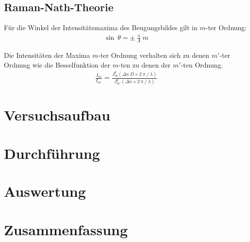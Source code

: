 \documentclass[12pt]{article}
\begin{document}
\subsection{Raman-Nath-Theorie}
Für die Winkel der Intensitätsmaxima des Beugungsbildes gilt in $m$-ter Ordnung:
\begin{align}
 \sin~\theta = \pm~\frac{\lambda}{\Lambda}~m
\end{align}

Die Intensitäten der Maxima $m$-ter Ordnung verhalten sich zu denen $m'$-ter Ordnung wie die Besselfunktion der $m$-ten zu denen der $m'$-ten Ordnung.
\begin{align}
 \frac{I_m}{I_{m'}} = \frac{J^2_m(\Delta n~D \times 2~\pi~/~\lambda)}{J^2_{m'}(\Delta n \times 2~\pi~/~\lambda)}
\end{align}






\section{Versuchsaufbau}

\section{Durchführung}

\section{Auswertung}

\section{Zusammenfassung}
\end{document}
